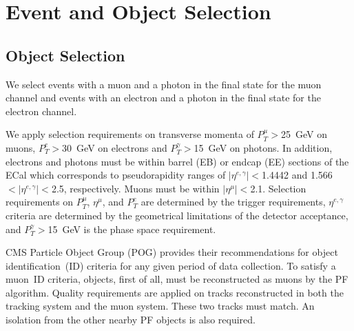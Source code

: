 \section{Event and Object Selection}
\label{sec:AN_Selection}

\subsection{Object Selection}
\label{sec:AN_ObjectSelection}

We select events with a muon and a photon in the final state for the muon channel and events with an electron and a photon in the final state for the electron channel. 

We apply selection requirements on transverse momenta of $P_T^{\mu}>$25~GeV on muons,  $P_T^e>$30~GeV on electrons and $P_T^{\gamma}>$15~GeV on photons. In addition, electrons and photons must be within barrel (EB) or endcap (EE) sections of the ECal which corresponds to pseudorapidity ranges of $|\eta^{e,\gamma}| < $1.4442 and 1.566$ < |\eta^{e,\gamma}| < $2.5, respectively. Muons must be within $|\eta^{\mu}|<$2.1. Selection requirements on $P_T^{\mu}$, $\eta^{\mu}$, and $P_T^e$ are determined by the trigger requirements, $\eta^{e,\gamma}$ criteria are determined by the geometrical limitations of the detector acceptance, and $P_T^{\gamma}>$15~GeV is the phase space requirement.

CMS Particle Object Group (POG) provides their recommendations for object identification~(ID) criteria for any given period of data collection. To satisfy a muon~ID criteria, objects, first of all, must be reconstructed as muons by the PF algorithm. Quality requirements are applied on tracks reconstructed in both the tracking system and the muon system. These two tracks must match. An isolation from the other nearby PF objects is also required.



